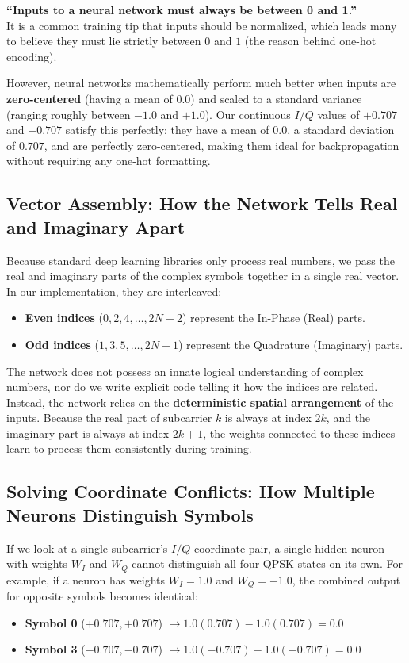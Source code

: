 \begin{misconception}
    \textbf{``Inputs to a neural network must always be between 0 and 1.''} \\
    It is a common training tip that inputs should be normalized, which leads many to believe they must lie strictly between $0$ and $1$ (the reason behind one-hot encoding). 
    
    However, neural networks mathematically perform much better when inputs are \textbf{zero-centered} (having a mean of $0.0$) and scaled to a standard variance (ranging roughly between $-1.0$ and $+1.0$). Our continuous $I/Q$ values of $+0.707$ and $-0.707$ satisfy this perfectly: they have a mean of $0.0$, a standard deviation of $0.707$, and are perfectly zero-centered, making them ideal for backpropagation without requiring any one-hot formatting.
\end{misconception}

\subsection{Vector Assembly: How the Network Tells Real and Imaginary Apart}
Because standard deep learning libraries only process real numbers, we pass the real and imaginary parts of the complex symbols together in a single real vector. In our implementation, they are interleaved:
\begin{itemize}
    \item \textbf{Even indices} ($0, 2, 4, \dots, 2N-2$) represent the In-Phase (Real) parts.
    \item \textbf{Odd indices} ($1, 3, 5, \dots, 2N-1$) represent the Quadrature (Imaginary) parts.
\end{itemize}

The network does not possess an innate logical understanding of complex numbers, nor do we write explicit code telling it how the indices are related. Instead, the network relies on the \textbf{deterministic spatial arrangement} of the inputs. Because the real part of subcarrier $k$ is always at index $2k$, and the imaginary part is always at index $2k+1$, the weights connected to these indices learn to process them consistently during training.

\subsection{Solving Coordinate Conflicts: How Multiple Neurons Distinguish Symbols}
If we look at a single subcarrier's $I/Q$ coordinate pair, a single hidden neuron with weights $W_I$ and $W_Q$ cannot distinguish all four QPSK states on its own. For example, if a neuron has weights $W_I = 1.0$ and $W_Q = -1.0$, the combined output for opposite symbols becomes identical:
\begin{itemize}
    \item \textbf{Symbol 0} ($+0.707, +0.707$) $\to 1.0(0.707) - 1.0(0.707) = 0.0$
    \item \textbf{Symbol 3} ($-0.707, -0.707$) $\to 1.0(-0.707) - 1.0(-0.707) = 0.0$
\end{itemize}

